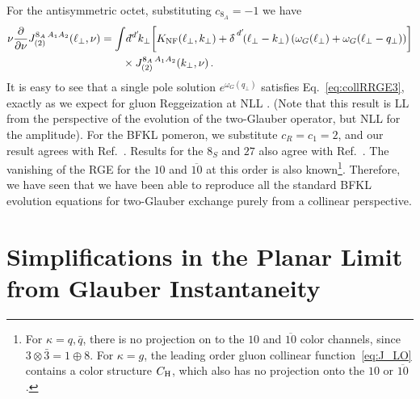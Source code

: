 \documentclass[letterpaper,11pt]{article}
\newcommand{\eq}[1]{Eq.~\eqref{eq:#1}}
\newcommand{\deltaslash}{{\delta\!\!\!{}^-}}
\newcommand{\nn}{\nonumber}
\newcommand\prnth[1]{\left(#1\right)}
\newcommand{\dbar}{d\hspace*{-0.08em}\bar{}\hspace*{0.1em}}
\begin{document}
For the antisymmetric octet, substituting $c_{8_A} = -1$ we have
\begin{align} \label{eq:collRRGE3}
 \nu\frac{\partial}{\partial \nu}J_{(2)}^{8_A\, A_1 A_2}(\ell_\perp,\nu) 
      &= \int\! \dbar^{d'}\!k_\perp \biggl[ K_\text{NF}(\ell_\perp, k_\perp)
+ \deltaslash^{d'}\!(\ell_\perp- k_\perp) \prnth{\omega_G(\ell_\perp) + \omega_G(\ell_\perp-q_\perp)} \biggr] 
  \nn\\
&\qquad \times J_{(2)}^{8_A\, A_1 A_2}(k_\perp,\nu) \,.
\end{align}
It is easy to see that a single pole solution $e^{\omega_G(q_\perp)}$ satisfies \eq{collRRGE3}, exactly as we expect for gluon Reggeization at NLL \cite{Fadin:1993wh}. (Note that this result is LL from the perspective of the evolution of the two-Glauber operator, but NLL for the amplitude).  For the BFKL pomeron, we substitute $c_R = c_1 = 2$, and our result agrees with Ref.~\cite{Fadin:1993wh}.
Results for the $8_S$ and $27$ also agree with Ref.~\cite{Ioffe:2010zz}.
The vanishing of the RGE for the $10$ and $\overline{10}$ at this order is also known\footnote{For $\kappa=q,\bar q$, there is no projection on to the $10$ and $\overline{10}$ color channels, since $3\otimes\bar 3=1\oplus 8$. For $\kappa=g$, the leading order gluon collinear function~\eqref{eq:J_LO} contains a color structure $C_{\rm H}$, which also has no projection onto the $10$ or $\overline{10}$.}.
Therefore, we have seen that we have been able to reproduce all the standard BFKL evolution equations for two-Glauber exchange purely from a collinear perspective.

\section{Simplifications in the Planar Limit from Glauber Instantaneity}
\label{sec:planar}
\end{document}
